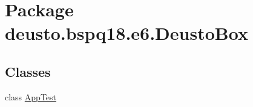 \hypertarget{namespacedeusto_1_1bspq18_1_1e6_1_1_deusto_box}{}\section{Package deusto.\+bspq18.\+e6.\+Deusto\+Box}
\label{namespacedeusto_1_1bspq18_1_1e6_1_1_deusto_box}
\subsection*{Classes}
\begin{DoxyCompactItemize}
\item 
class \mbox{\hyperlink{classdeusto_1_1bspq18_1_1e6_1_1_deusto_box_1_1_app_test}{App\+Test}}
\end{DoxyCompactItemize}
